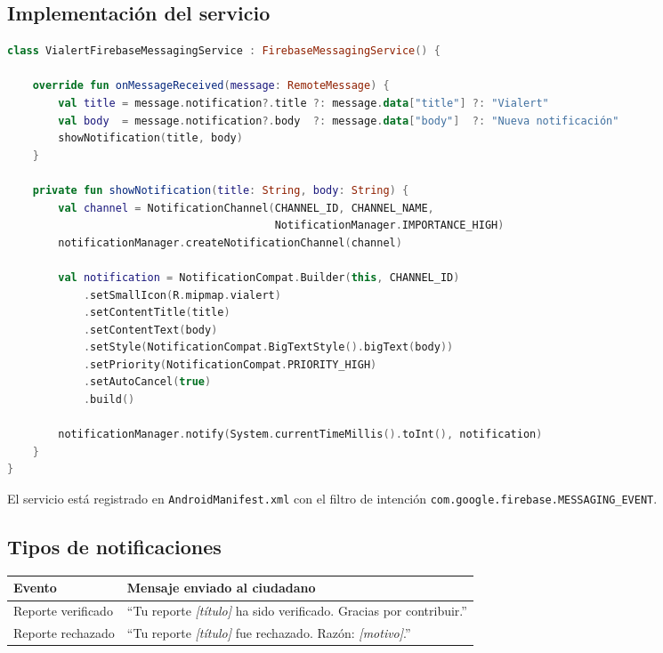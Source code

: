 \documentclass[12pt,a4paper]{article}
\begin{document}
\subsection{Implementación del servicio}

\begin{lstlisting}[language=Kotlin, caption={VialertFirebaseMessagingService.kt}]
class VialertFirebaseMessagingService : FirebaseMessagingService() {

    override fun onMessageReceived(message: RemoteMessage) {
        val title = message.notification?.title ?: message.data["title"] ?: "Vialert"
        val body  = message.notification?.body  ?: message.data["body"]  ?: "Nueva notificación"
        showNotification(title, body)
    }

    private fun showNotification(title: String, body: String) {
        val channel = NotificationChannel(CHANNEL_ID, CHANNEL_NAME,
                                          NotificationManager.IMPORTANCE_HIGH)
        notificationManager.createNotificationChannel(channel)

        val notification = NotificationCompat.Builder(this, CHANNEL_ID)
            .setSmallIcon(R.mipmap.vialert)
            .setContentTitle(title)
            .setContentText(body)
            .setStyle(NotificationCompat.BigTextStyle().bigText(body))
            .setPriority(NotificationCompat.PRIORITY_HIGH)
            .setAutoCancel(true)
            .build()

        notificationManager.notify(System.currentTimeMillis().toInt(), notification)
    }
}
\end{lstlisting}

El servicio está registrado en \texttt{AndroidManifest.xml} con el filtro de intención \texttt{com.google.firebase.MESSAGING\_EVENT}.

\subsection{Tipos de notificaciones}

\begin{center}
\begin{tabularx}{0.9\textwidth}{lX}
\toprule
\textbf{Evento} & \textbf{Mensaje enviado al ciudadano} \\
\midrule
Reporte verificado & ``Tu reporte \textit{[título]} ha sido verificado. Gracias por contribuir.'' \\
Reporte rechazado & ``Tu reporte \textit{[título]} fue rechazado. Razón: \textit{[motivo]}.'' \\
\bottomrule
\end{tabularx}
\end{center}
\end{document}
